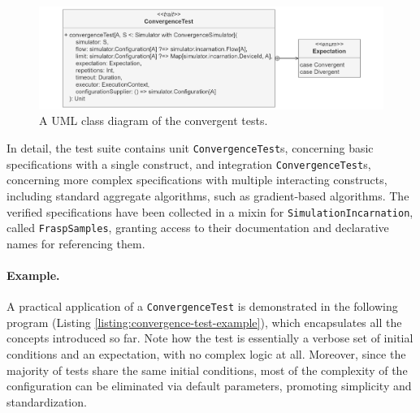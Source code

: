 \begin{figure}[!ht]
  \centering
  \includegraphics[width=1\textwidth]{resources/figures/diagrams/short/convergence-test-class-diagram.pdf}
  \caption[A UML class diagram of the convergent tests]{
    A UML class diagram of the convergent tests.
  }
  \label{figure:convergent-test-class-diagram}
\end{figure}

In detail, the test suite contains unit \texttt{ConvergenceTest}s, concerning
basic specifications with a single construct, and integration
\texttt{ConvergenceTest}s, concerning more complex specifications with multiple
interacting constructs, including standard aggregate algorithms, such as
gradient-based algorithms. The verified specifications have been collected in a
mixin for \texttt{SimulationIncarnation}, called \texttt{FraspSamples},
granting access to their documentation and declarative names for referencing
them.

\paragraph{Example.}
A practical application of a \texttt{ConvergenceTest} is demonstrated in the
following program (Listing \ref{listing:convergence-test-example}), which
encapsulates all the concepts introduced so far. Note how the test is
essentially a verbose set of initial conditions and an expectation, with no
complex logic at all. Moreover, since the majority of tests share the same
initial conditions, most of the complexity of the configuration can be
eliminated via default parameters, promoting simplicity and standardization.

